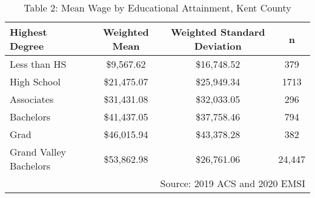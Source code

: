 \documentclass{article}
\begin{document}
\begin{table}[ht]
\centering
\caption*{Table 2: Mean Wage by Educational Attainment, Kent County}
\begin{tabular}{lccc}
  \hline
Highest Degree & Weighted Mean & Weighted Standard Deviation & n \\ 
  \hline
Less than HS & \$9,567.62 & \$16,748.52 & 379 \\
High School & \$21,475.07 & \$25,949.34 & 1713 \\
Associates & \$31,431.08 & \$32,033.05 & 296 \\ 
Bachelors & \$41,437.05 & \$37,758.46 & 794 \\ 
Grad & \$46,015.94 & \$43,378.28 & 382 \\
Grand Valley Bachelors & \$53,862.98 & \$26,761.06 & 24,447\\
   \hline
\multicolumn{4}{r}{\scriptsize{Source: 2019 ACS and 2020 EMSI}}
\end{tabular}
\end{table}
\end{document}
